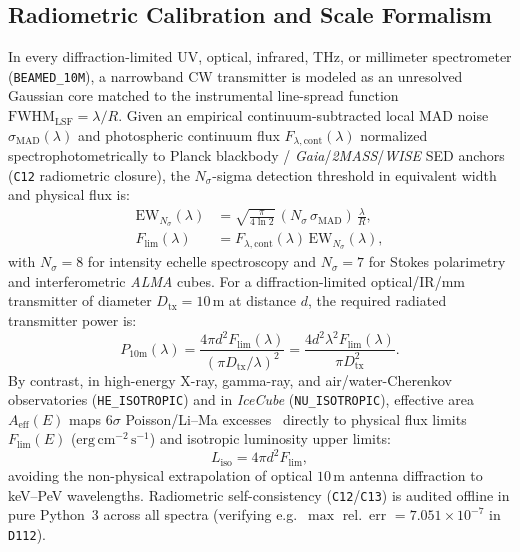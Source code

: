\documentclass[twocolumn,10pt]{article}
\begin{document}
\subsection{Radiometric Calibration and Scale Formalism}
In every diffraction-limited UV, optical, infrared, THz, or millimeter spectrometer (\texttt{BEAMED\_10M}), a narrowband CW transmitter is modeled as an unresolved Gaussian core matched to the instrumental line-spread function $\mathrm{FWHM}_{\mathrm{LSF}} = \lambda / R$. Given an empirical continuum-subtracted local MAD noise $\sigma_{\mathrm{MAD}}(\lambda)$ and photospheric continuum flux $F_{\lambda,\mathrm{cont}}(\lambda)$ normalized spectrophotometrically to Planck blackbody / \textit{Gaia}/\textit{2MASS}/\textit{WISE} SED anchors (\texttt{C12} radiometric closure), the $N_\sigma$-sigma detection threshold in equivalent width and physical flux is:
\begin{align}
\mathrm{EW}_{N_\sigma}(\lambda) &= \sqrt{\frac{\pi}{4\ln 2}}\,(N_\sigma\,\sigma_{\mathrm{MAD}})\,\frac{\lambda}{R}, \\
F_{\mathrm{lim}}(\lambda) &= F_{\lambda,\mathrm{cont}}(\lambda)\,\mathrm{EW}_{N_\sigma}(\lambda),
\end{align}
with $N_\sigma = 8$ for intensity echelle spectroscopy and $N_\sigma = 7$ for Stokes polarimetry and interferometric \textit{ALMA} cubes. For a diffraction-limited optical/IR/mm transmitter of diameter $D_{\mathrm{tx}} = 10\,\mathrm{m}$ at distance $d$, the required radiated transmitter power is:
\begin{equation}
P_{10\mathrm{m}}(\lambda) = \frac{4\pi d^2 F_{\mathrm{lim}}(\lambda)}{(\pi D_{\mathrm{tx}}/\lambda)^2} = \frac{4 d^2 \lambda^2 F_{\mathrm{lim}}(\lambda)}{\pi D_{\mathrm{tx}}^2}.
\end{equation}
By contrast, in high-energy X-ray, gamma-ray, and air/water-Cherenkov observatories (\texttt{HE\_ISOTROPIC}) and in \textit{IceCube} (\texttt{NU\_ISOTROPIC}), effective area $A_{\mathrm{eff}}(E)$ maps $6\sigma$ Poisson/Li--Ma excesses~\cite{LiMa1983} directly to physical flux limits $F_{\mathrm{lim}}(E)$ ($\mathrm{erg\,cm^{-2}\,s^{-1}}$) and isotropic luminosity upper limits:
\begin{equation}
L_{\mathrm{iso}} = 4\pi d^2 F_{\mathrm{lim}},
\end{equation}
avoiding the non-physical extrapolation of optical $10\,\mathrm{m}$ antenna diffraction to keV--PeV wavelengths. Radiometric self-consistency (\texttt{C12}/\texttt{C13}) is audited offline in pure Python~3 across all spectra (verifying e.g.\ $\max$ rel.\ err $= 7.051\times 10^{-7}$ in \texttt{D112}).
\end{document}
